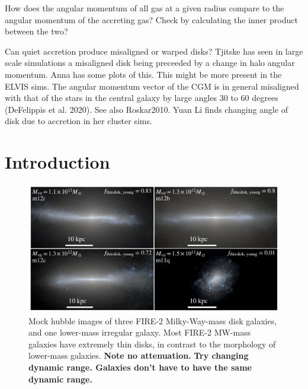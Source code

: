\documentclass[fleqn,usenatbib]{mnras}
\begin{document}
How does the angular momentum of all gas at a given radius compare to the angular momentum of the accreting gas?
Check by calculating the inner product between the two?

Can quiet accretion produce misaligned or warped disks?
Tjitske has seen in large scale simulations a misaligned disk being preceeded by a change in halo angular momentum.
Anna has some plots of this. This might be more present in the ELVIS sims.
The angular momentum vector of the CGM is in general misaligned with that of the stars in the central galaxy by large angles  30 to 60 degrees (DeFelippis et al. 2020).
See also Roskar2010.
Yuan Li finds changing angle of disk due to accretion in her cluster sims.

\section{Introduction}
\label{s: introduction}

\begin{figure}
    \centering
    \includegraphics[width=\textwidth]{figures/stars.pdf}
    \caption{
    Mock hubble images of three FIRE-2 Milky-Way-mass disk galaxies, and one lower-mass irregular galaxy.
    Most FIRE-2 MW-mass galaxies have extremely thin disks, in contrast to the morphology of lower-mass galaxies.
    \textbf{Note no attenuation.}
    \textbf{
    Try changing dynamic range.
    Galaxies don't have to have the same dynamic range.
    }
    }
    \label{f: stars}
\end{figure}
\end{document}
